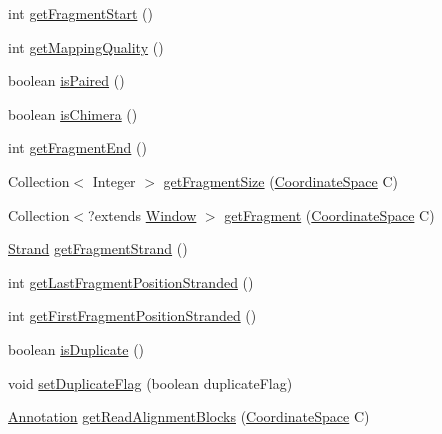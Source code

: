 \begin{DoxyCompactItemize}
\item 
int \hyperlink{classumms_1_1core_1_1alignment_1_1_single_end_alignment_a8cc3012be5d52c863d56b719ded4f4d7}{get\+Fragment\+Start} ()
\item 
int \hyperlink{classumms_1_1core_1_1alignment_1_1_single_end_alignment_a06ceaaa21a4b84604e2db3f7ef114402}{get\+Mapping\+Quality} ()
\item 
boolean \hyperlink{classumms_1_1core_1_1alignment_1_1_single_end_alignment_a8fceb6ed7f1a65205bf787e4a5a69420}{is\+Paired} ()
\item 
boolean \hyperlink{classumms_1_1core_1_1alignment_1_1_single_end_alignment_ac1acf67653bca7b09d4316c4ac6cd4f0}{is\+Chimera} ()
\item 
int \hyperlink{classumms_1_1core_1_1alignment_1_1_single_end_alignment_a38409b7b5071dbc0c884b6b5412ed1e0}{get\+Fragment\+End} ()
\item 
Collection$<$ Integer $>$ \hyperlink{classumms_1_1core_1_1alignment_1_1_single_end_alignment_a2afaffd724b67924c4eb259457307c76}{get\+Fragment\+Size} (\hyperlink{interfaceumms_1_1core_1_1coordinatesystem_1_1_coordinate_space}{Coordinate\+Space} C)
\item 
Collection$<$?extends \hyperlink{interfaceumms_1_1core_1_1feature_1_1_window}{Window} $>$ \hyperlink{classumms_1_1core_1_1alignment_1_1_single_end_alignment_a4bfe393bea33fbdd9f36beb72d226afc}{get\+Fragment} (\hyperlink{interfaceumms_1_1core_1_1coordinatesystem_1_1_coordinate_space}{Coordinate\+Space} C)
\item 
\hyperlink{enumumms_1_1core_1_1annotation_1_1_annotation_1_1_strand}{Strand} \hyperlink{classumms_1_1core_1_1alignment_1_1_single_end_alignment_a884e160d9e77c62b6e4ffa26b46bb104}{get\+Fragment\+Strand} ()
\item 
int \hyperlink{classumms_1_1core_1_1alignment_1_1_single_end_alignment_a7ab034b249df1e27ea154af3993e55e7}{get\+Last\+Fragment\+Position\+Stranded} ()
\item 
int \hyperlink{classumms_1_1core_1_1alignment_1_1_single_end_alignment_ac9e20c5185b1732fc1fbcd66c670cff0}{get\+First\+Fragment\+Position\+Stranded} ()
\item 
boolean \hyperlink{classumms_1_1core_1_1alignment_1_1_single_end_alignment_a4eb89311179898e19bf4319e133f3e62}{is\+Duplicate} ()
\item 
void \hyperlink{classumms_1_1core_1_1alignment_1_1_single_end_alignment_a123904f9fe189195f21b5d04b55fe08a}{set\+Duplicate\+Flag} (boolean duplicate\+Flag)
\item 
\hyperlink{interfaceumms_1_1core_1_1annotation_1_1_annotation}{Annotation} \hyperlink{classumms_1_1core_1_1alignment_1_1_single_end_alignment_a8ec7d5ed9c1d86ea1bbabe2966e1cac9}{get\+Read\+Alignment\+Blocks} (\hyperlink{interfaceumms_1_1core_1_1coordinatesystem_1_1_coordinate_space}{Coordinate\+Space} C)

\end{DoxyCompactItemize}
